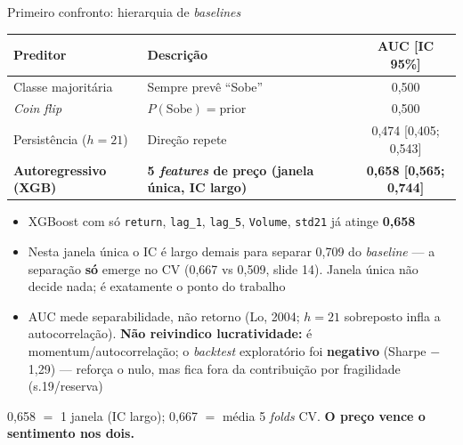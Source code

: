 \documentclass[10pt,aspectratio=169]{beamer}
\begin{document}
\begin{frame}{Primeiro confronto: hierarquia de \textit{baselines}}
  \begin{table}
    \small
    \begin{tabular}{llc}
      \toprule
      \textbf{Preditor} & \textbf{Descrição} & \textbf{AUC [IC 95\%]} \\
      \midrule
      Classe majoritária    & Sempre prevê ``Sobe''           & 0{,}500 \\
      \textit{Coin flip}    & $P(\text{Sobe}) = \text{prior}$ & 0{,}500 \\
      Persistência ($h=21$) & Direção repete                  & 0{,}474 [0{,}405; 0{,}543] \\
      \textbf{Autoregressivo (XGB)} & \textbf{5 \textit{features} de preço (janela única, IC largo)} & \textbf{0{,}658 [0{,}565; 0{,}744]} \\
      \bottomrule
    \end{tabular}
  \end{table}
  \vspace{1ex}
  \begin{itemize}
    \item XGBoost com só \texttt{return}, \texttt{lag\_1}, \texttt{lag\_5}, \texttt{Volume}, \texttt{std21} já atinge \textbf{0{,}658}
    \item Nesta janela única o IC é largo demais para separar 0{,}709 do \textit{baseline} --- a separação \textbf{só} emerge no CV (0{,}667 vs 0{,}509, slide 14). Janela única não decide nada; é exatamente o ponto do trabalho
    \item \alert{AUC mede separabilidade, não retorno} (Lo, 2004; $h=21$ sobreposto infla a autocorrelação). \textbf{Não reivindico lucratividade:} é momentum/autocorrelação; o \textit{backtest} exploratório foi \textbf{negativo} (Sharpe $-$1{,}29) --- reforça o nulo, mas fica fora da contribuição por fragilidade (s.19/reserva)
  \end{itemize}
  \vspace{0.5ex}
  {\footnotesize \alert{0{,}658 $=$ 1 janela (IC largo); 0{,}667 $=$ média 5 \textit{folds} CV. \textbf{O preço vence o sentimento nos dois.}}}
\end{frame}
\end{document}

